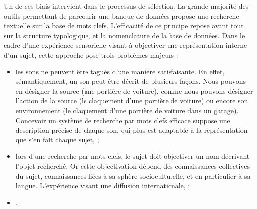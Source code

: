 Un de ces biais intervient dans le processus de sélection. La grande majorité des outils permettant de parcourir une banque de données propose une recherche textuelle sur la base de mots clefs. L’efficacité de ce principe repose avant tout sur la structure typologique, et la nomenclature de la base de données. Dans le cadre d'une expérience sensorielle visant à objectiver une représentation interne d'un sujet, cette approche pose trois problèmes majeurs :

\begin{itemize}
\item les sons ne peuvent être tagués d'une manière satisfaisante. En effet, sémantiquement, un son peut être décrit de plusieurs façons. Nous pouvons en désigner la source (une portière de voiture), comme nous pouvons désigner l'action de la source (le claquement d’une portière de voiture) ou encore son environnement (le claquement d’une portière de voiture dans un garage). Concevoir un système de recherche par mots clefs efficace suppose une description précise de chaque son, qui plus est adaptable à la représentation que s’en fait chaque sujet,  ;

\item lors d'une recherche par mots clefs, le sujet doit objectiver un nom décrivant l'objet recherché. Or cette objectivation dépend des connaissances collectives du sujet, connaissances liées à sa sphère socioculturelle, et en particulier à sa langue. L'expérience visant une diffusion internationale,  ;

\item {}   .
\end{itemize}

